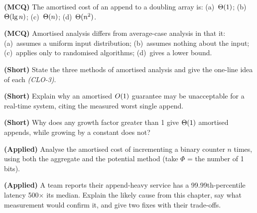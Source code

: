 \begin{reviewq}
  \item \textbf{(MCQ)} The amortised cost of an append to a doubling array is:
        (a)~$\Theta(1)$; (b)~$\Theta(\operatorname{lg} n)$; (c)~$\Theta(n)$;
        (d)~$\Theta(n^{2})$.
  \item \textbf{(MCQ)} Amortised analysis differs from average-case analysis in
        that it: (a)~assumes a uniform input distribution; (b)~assumes nothing
        about the input; (c)~applies only to randomised algorithms; (d)~gives a
        lower bound.
  \item \textbf{(Short)} State the three methods of amortised analysis and give
        the one-line idea of each \emph{(CLO-3)}.
  \item \textbf{(Short)} Explain why an amortised $O(1)$ guarantee may be
        unacceptable for a real-time system, citing the measured worst single
        append.
  \item \textbf{(Short)} Why does any growth factor greater than 1 give
        $\Theta(1)$ amortised appends, while growing by a constant does not?
  \item \textbf{(Applied)} Analyse the amortised cost of incrementing a binary
        counter $n$ times, using both the aggregate and the potential method
        (take $\Phi$ = the number of 1 bits).
  \item \textbf{(Applied)} A team reports their append-heavy service has a
        99.99th-percentile latency 500$\times$ its median. Explain the likely
        cause from this chapter, say what measurement would confirm it, and
        give two fixes with their trade-offs.
\end{reviewq}
